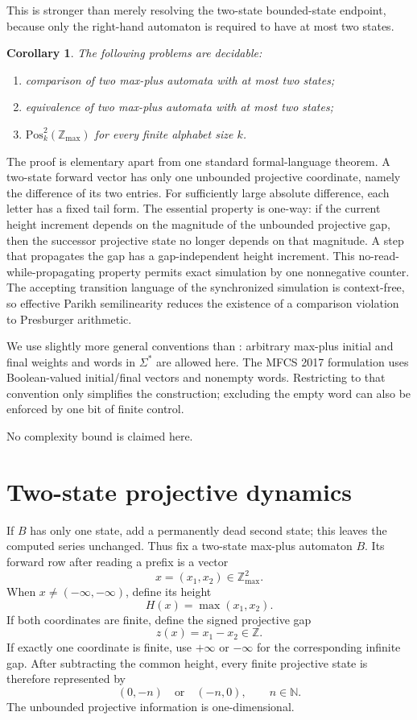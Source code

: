 \documentclass[11pt]{article}
\newtheorem{corollary}[theorem]{Corollary}
\newcommand{\Zmax}{\mathbb{Z}_{\max}}
\newcommand{\minf}{-\infty}
\begin{document}
This is stronger than merely resolving the two-state bounded-state endpoint, because only the right-hand automaton is required to have at most two states.

\begin{corollary}\label{cor:basic}
The following problems are decidable:
\begin{enumerate}[label=(\roman*)]
\item comparison of two max-plus automata with at most two states;
\item equivalence of two max-plus automata with at most two states;
\item $\mathrm{Pos}^2_k(\Zmax)$ for every finite alphabet size $k$.
\end{enumerate}
\end{corollary}

The proof is elementary apart from one standard formal-language theorem. A two-state forward vector has only one unbounded projective coordinate, namely the difference of its two entries. For sufficiently large absolute difference, each letter has a fixed tail form. The essential property is one-way: if the current height increment depends on the magnitude of the unbounded projective gap, then the successor projective state no longer depends on that magnitude. A step that propagates the gap has a gap-independent height increment. This no-read-while-propagating property permits exact simulation by one nonnegative counter. The accepting transition language of the synchronized simulation is context-free, so effective Parikh semilinearity \cite{Parikh1966} reduces the existence of a comparison violation to Presburger arithmetic.

We use slightly more general conventions than \cite{DGM2017}: arbitrary max-plus initial and final weights and words in $\Sigma^*$ are allowed here. The MFCS 2017 formulation uses Boolean-valued initial/final vectors and nonempty words. Restricting to that convention only simplifies the construction; excluding the empty word can also be enforced by one bit of finite control.

No complexity bound is claimed here.

\section{Two-state projective dynamics}

If $B$ has only one state, add a permanently dead second state; this leaves the computed series unchanged. Thus fix a two-state max-plus automaton $B$. Its forward row after reading a prefix is a vector
\[
x=(x_1,x_2)\in\Zmax^2.
\]
When $x\neq(\minf,\minf)$, define its height
\[
H(x)=\max(x_1,x_2).
\]
If both coordinates are finite, define the signed projective gap
\[
z(x)=x_1-x_2\in\mathbb Z.
\]
If exactly one coordinate is finite, use $+\infty$ or $-\infty$ for the corresponding infinite gap. After subtracting the common height, every finite projective state is therefore represented by
\[
(0,-n)\quad\text{or}\quad(-n,0),\qquad n\in\mathbb N.
\]
The unbounded projective information is one-dimensional.
\end{document}
